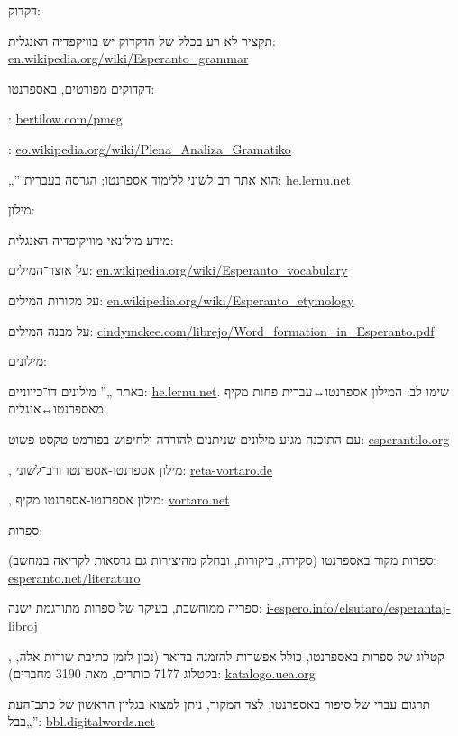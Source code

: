 
דקדוק:
\begin{compactitem}
\item תקציר לא רע בכלל של הדקדוק יש בוויקפדיה האנגלית: \url{en.wikipedia.org/wiki/Esperanto_grammar}
\item דקדוקים מפורטים, באספרנטו:
	\begin{compactitem}
	\item {}: \url{bertilow.com/pmeg}
	\item {}: \url{eo.wikipedia.org/wiki/Plena_Analiza_Gramatiko}
	\end{compactitem}
\item „” הוא אתר רב־לשוני ללימוד אספרנטו; הגרסה בעברית: \url{he.lernu.net}
\end{compactitem}

מילון:
\begin{compactitem}
\item מידע מילונאי מוויקיפדיה האנגלית:
	\begin{compactitem}
	\item על אוצר־המילים: \url{en.wikipedia.org/wiki/Esperanto_vocabulary}
	\item על מקורות המילים: \url{en.wikipedia.org/wiki/Esperanto_etymology}
	\end{compactitem}
\item על מבנה המילים: \url{cindymckee.com/librejo/Word_formation_in_Esperanto.pdf}
\item מילונים:
	\begin{compactitem}
	\item באתר „” מילונים דו־כיווניים: \url{he.lernu.net}. שימו לב: המילון אספרנטו{↔}עברית פחות מקיף מאספרנטו{↔}אנגלית.
	\item עם התוכנה  מגיע מילונים שניתנים להורדה ולחיפוש בפורמט טקסט פשוט: \url{esperantilo.org}
	\item {}, מילון אספרנטו-אספרנטו ורב־לשוני: \url{reta-vortaro.de}
	\item {}, מילון אספרנטו-אספרנטו מקיף: \url{vortaro.net}
	\end{compactitem}
\end{compactitem}

ספרות:
\begin{compactitem}
\item ספרות מקור באספרנטו (סקירה, ביקורות, ובחלק מהיצירות גם גרסאות לקריאה במחשב): \url{esperanto.net/literaturo}
\item ספריה ממוחשבת, בעיקר של ספרות מתורגמת ישנה: \url{i-espero.info/elsutaro/esperantaj-libroj}
\item {}, קטלוג של ספרות באספרנטו, כולל אפשרות להזמנה בדואר (נכון לזמן כתיבת שורות אלה, בקטלוג 7177 כותרים, מאת 3190 מחברים): \url{katalogo.uea.org}
\item תרגום עברי של סיפור באספרנטו, לצד המקור, ניתן למצוא בגליון הראשון של כתב־העת „בבל”: \url{bbl.digitalwords.net}
\end{compactitem}

